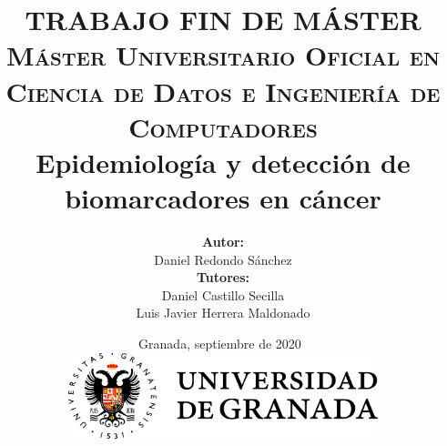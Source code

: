 \documentclass[a4paper, 12pt]{book}
\begin{document}
 \pagestyle{fancyplain}
 \lhead[\fancyplain{}{\small\bf\thepage}]{\fancyplain{}{\small\bf\rightmark}}
 \rhead[\fancyplain{}{\small\bf\leftmark}]{\fancyplain{}{\small\bf\thepage}}
 \cfoot[\fancyplain{\small\bf\thepage}{}]{\fancyplain{\small\bf\thepage}{}}

\author{\textbf{Autor:}\vspace{-0.1cm}\\ Daniel Redondo Sánchez \vspace{0.2cm}\\
\textbf{Tutores:}\vspace{0.1cm}\\
Daniel Castillo Secilla\\
Luis Javier Herrera Maldonado
}
	
\title{
	\vspace{-4cm}
	\centering
	{\Large TRABAJO FIN DE MÁSTER\\} \vspace{0.3cm}
	{\large \textsc{Máster Universitario Oficial en Ciencia de Datos e Ingeniería de Computadores\\}}
		{\LARGE \textbf{\bfseries{Epidemiología y detección de biomarcadores en cáncer\\}}}
		\vspace{-0.75cm}
}


\date{\vspace{1cm}
	Granada, septiembre de 2020 \\
	\vspace{0.5cm}
	\includegraphics[height=2.5cm]{logos/ugr.png} \\ 
}
	
	\mainmatter
	\maketitle
	\thispagestyle{empty}
	
	
\end{document}
